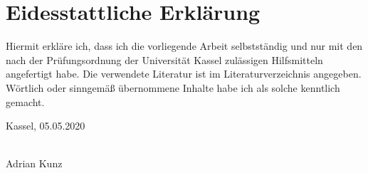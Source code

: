 \chapter*{Eidesstattliche Erklärung}


Hiermit erkläre ich, dass ich die vorliegende Arbeit selbstständig und nur mit den nach der Prüfungsordnung der Universität Kassel zulässigen Hilfsmitteln angefertigt habe.
Die verwendete Literatur ist im Literaturverzeichnis angegeben.
Wörtlich oder sinngemäß übernommene Inhalte habe ich als solche kenntlich gemacht.

\vspace{1cm}

Kassel, 05.05.2020

\begin{flushright}
  \underline{\hspace{7cm}} \\
  Adrian Kunz
\end{flushright}

